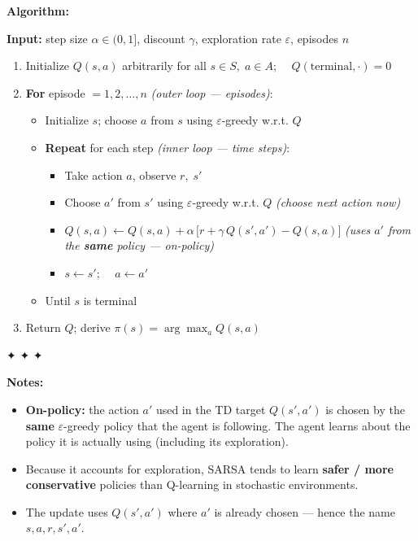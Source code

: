\documentclass[11pt]{article}
\providecommand{\tightlist}{%
      \setlength{\itemsep}{0pt}\setlength{\parskip}{0pt}}
\begin{document}
    \textbf{Algorithm:}

\textbf{Input:} step size \(\alpha \in (0,1]\), discount \(\gamma\),
exploration rate \(\varepsilon\), episodes \(n\)

\begin{enumerate}
\def\labelenumi{\arabic{enumi}.}
\item
  Initialize \(Q(s,a)\) arbitrarily for all \(s \in S,\; a \in A\);
  \(\quad Q(\text{terminal}, \cdot) = 0\)
\item
  \textbf{For} episode \(= 1, 2, \ldots, n\) \emph{(outer loop ---
  episodes)}:

  \begin{itemize}
  \tightlist
  \item
    Initialize \(s\); choose \(a\) from \(s\) using
    \(\varepsilon\)-greedy w.r.t. \(Q\)
  \item
    \textbf{Repeat} for each step \emph{(inner loop --- time steps)}:

    \begin{itemize}
    \tightlist
    \item
      Take action \(a\), observe \(r,\; s'\)
    \item
      Choose \(a'\) from \(s'\) using \(\varepsilon\)-greedy w.r.t.
      \(Q\) \emph{(choose next action now)}
    \item
      \(Q(s,a) \leftarrow Q(s,a) + \alpha\,\bigl[r + \gamma\, Q(s',a') - Q(s,a)\bigr]\)
      \emph{(uses \(a'\) from the \textbf{same} policy --- on-policy)}
    \item
      \(s \leftarrow s'\); \(\quad a \leftarrow a'\)
    \end{itemize}
  \item
    Until \(s\) is terminal
  \end{itemize}
\item
  Return \(Q\); derive \(\pi(s) = \arg\max_a Q(s,a)\)
\end{enumerate}

✦ ✦ ✦

\textbf{Notes:}

\begin{itemize}
\tightlist
\item
  \textbf{On-policy:} the action \(a'\) used in the TD target
  \(Q(s',a')\) is chosen by the \textbf{same} \(\varepsilon\)-greedy
  policy that the agent is following. The agent learns about the policy
  it is actually using (including its exploration).
\item
  Because it accounts for exploration, SARSA tends to learn
  \textbf{safer / more conservative} policies than Q-learning in
  stochastic environments.
\item
  The update uses \(Q(s',a')\) where \(a'\) is already chosen --- hence
  the name \(s, a, r, s', a'\).
\end{itemize}
\end{document}
